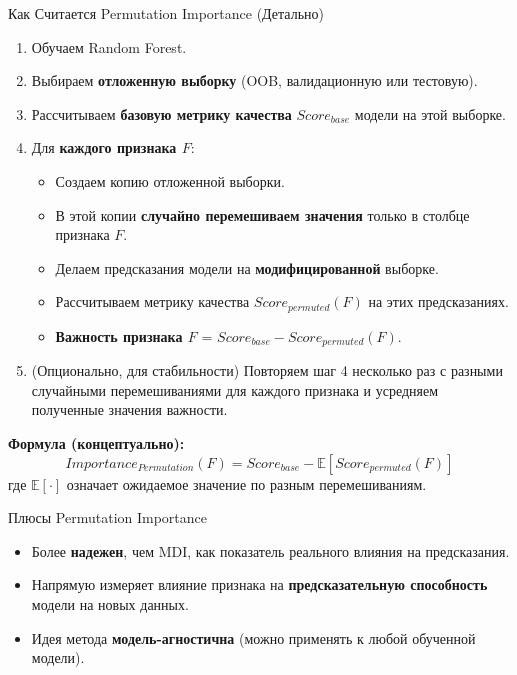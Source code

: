 \begin{myexampleblock}{Как Считается Permutation Importance (Детально)}
    \begin{enumerate}[nosep, wide, labelindent=0pt]
        \item Обучаем Random Forest.
        \item Выбираем \textbf{отложенную выборку} (OOB, валидационную или тестовую).
        \item Рассчитываем \textbf{базовую метрику качества} $Score_{base}$ модели на этой выборке.
        \item Для \textbf{каждого признака $F$}:
            \begin{itemize}[nosep, leftmargin=*]
                \item Создаем копию отложенной выборки.
                \item В этой копии \textbf{случайно перемешиваем значения} только в столбце признака $F$.
                \item Делаем предсказания модели на \textbf{модифицированной} выборке.
                \item Рассчитываем метрику качества $Score_{permuted}(F)$ на этих предсказаниях.
                \item \textbf{Важность признака $F$} = $Score_{base} - Score_{permuted}(F)$.
            \end{itemize}
        \item (Опционально, для стабильности) Повторяем шаг 4 несколько раз с разными случайными перемешиваниями для каждого признака и усредняем полученные значения важности.
    \end{enumerate}
    \textbf{Формула (концептуально):}
    \[
    Importance_{Permutation}(F) = Score_{base} - \mathbb{E}[Score_{permuted}(F)]
    \]
    где $\mathbb{E}[\cdot]$ означает ожидаемое значение по разным перемешиваниям.
\end{myexampleblock}

\begin{myblock}{Плюсы Permutation Importance}
    \begin{itemize}[nosep, leftmargin=*]
        \item Более \textbf{надежен}, чем MDI, как показатель реального влияния на предсказания.
        \item Напрямую измеряет влияние признака на \textbf{предсказательную способность} модели на новых данных.
        \item Идея метода \textbf{модель-агностична} (можно применять к любой обученной модели).
    \end{itemize}
\end{myblock}

